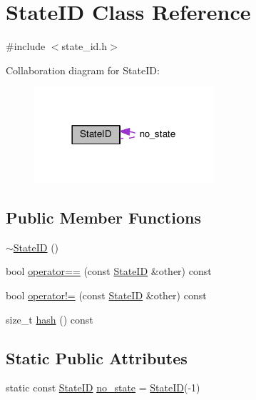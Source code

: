\hypertarget{classStateID}{\section{State\-I\-D Class Reference}
\label{classStateID}
}


{\ttfamily \#include $<$state\-\_\-id.\-h$>$}



Collaboration diagram for State\-I\-D\-:
\nopagebreak
\begin{figure}[H]
\begin{center}
\leavevmode
\includegraphics[width=189pt]{classStateID__coll__graph}
\end{center}
\end{figure}
\subsection*{Public Member Functions}
\begin{DoxyCompactItemize}
\item 
\hyperlink{classStateID_a9acee81a52e18954c7d0760c552fe380}{$\sim$\-State\-I\-D} ()
\item 
bool \hyperlink{classStateID_a688c3736a28c5f729514c4951269ea45}{operator==} (const \hyperlink{classStateID}{State\-I\-D} \&other) const 
\item 
bool \hyperlink{classStateID_a65eb6b1dd0809d1645f1d84174fa1fb1}{operator!=} (const \hyperlink{classStateID}{State\-I\-D} \&other) const 
\item 
size\-\_\-t \hyperlink{classStateID_a12b3ce9d776d084a13fa0f1c22d4c9ec}{hash} () const 
\end{DoxyCompactItemize}
\subsection*{Static Public Attributes}
\begin{DoxyCompactItemize}
\item 
static const \hyperlink{classStateID}{State\-I\-D} \hyperlink{classStateID_a953c1cba465ad12f901ba7a088c2fb5a}{no\-\_\-state} = \hyperlink{classStateID}{State\-I\-D}(-\/1)
\end{DoxyCompactItemize}
